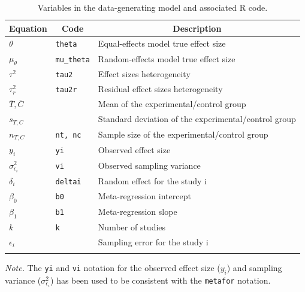 \documentclass[
  man,floatsintext]{apa6}
\begin{document}
\begin{table}[H]

\begin{center}
\begin{threeparttable}

\caption{\label{tab:notation-tab}Variables in the data-generating model and associated R code.}

\begin{tabular}{lll}
\toprule
Equation & \multicolumn{1}{c}{Code} & \multicolumn{1}{c}{Description}\\
\midrule
$\theta$ & \texttt{theta} & Equal-effects model true effect size\\
$\mu_{\theta}$ & \texttt{mu\_theta} & Random-effects model true effect size\\
$\tau^2$ & \texttt{tau2} & Effect sizes heterogeneity\\
$\tau^2_r$ & \texttt{tau2r} & Residual effect sizes heterogeneity\\
$\overline{T}, \overline{C}$ & \texttt{} & Mean of the experimental/control group\\
$s_{T, C}$ & \texttt{} & Standard deviation of the experimental/control group\\
$n_{T, C}$ & \texttt{nt, nc} & Sample size of the experimental/control group\\
$y_i$ & \texttt{yi} & Observed effect size\\
$\sigma_{\epsilon_i}^{2}$ & \texttt{vi} & Observed sampling variance\\
$\delta_i$ & \texttt{deltai} & Random effect for the study i\\
$\beta_0$ & \texttt{b0} & Meta-regression intercept\\
$\beta_1$ & \texttt{b1} & Meta-regression slope\\
$k$ & \texttt{k} & Number of studies\\
$\epsilon_i$ & \texttt{} & Sampling error for the study i\\
\bottomrule
\addlinespace
\end{tabular}

\begin{tablenotes}[para]
\normalsize{\textit{Note.} The \texttt{yi} and \texttt{vi} notation for the observed effect size ($y_i$) and sampling variance ($\sigma_{\epsilon_i}^{2}$) has been used to be consistent with the \texttt{metafor} notation.}
\end{tablenotes}

\end{threeparttable}
\end{center}

\end{table}
\end{document}
